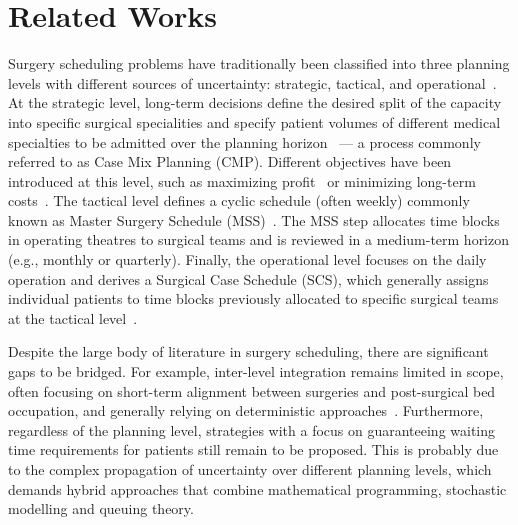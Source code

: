 \section{Related Works\label{sec:lit_review}}

Surgery scheduling problems have traditionally been classified into three planning levels with different sources of uncertainty: strategic, tactical, and operational~\citep{Rahimi2020Review, Cardoen2010, wang2021operating, Melo2025}. At the strategic level, long-term decisions define the desired split of the capacity into specific surgical specialities and specify patient volumes of different medical specialties to be admitted over the planning horizon~\citep{Burdett2023} --- a process commonly referred to as Case Mix Planning (CMP). Different objectives have been introduced at this level, such as maximizing profit~\citep{Fugener2015, Ma2013Mult} or minimizing long-term costs~\citep{Hof2015Casemix, Mcrae2020}.  The tactical level defines a cyclic schedule (often weekly) commonly known as Master Surgery Schedule (MSS)~\citep{Bovim2020,Siqueira2018INTO,Carneiro2025}. The MSS step allocates time blocks in operating theatres to surgical teams and is reviewed in a medium-term horizon (e.g., monthly or quarterly). 
Finally, the operational level focuses on the daily operation and derives a Surgical Case Schedule (SCS), which generally assigns individual patients to time blocks previously allocated to specific surgical teams at the tactical level~\citep{Vieira2025, Harris2022}.

Despite the large body of literature in surgery scheduling, there are significant gaps to be bridged. For example, inter-level integration remains limited in scope, often focusing on short-term alignment between surgeries and post-surgical bed occupation, and generally relying on deterministic approaches~\citep{Melo2025,wang2021operating, Siqueira2018INTO}. 
Furthermore, regardless of the planning level, strategies with a focus on guaranteeing waiting time requirements for patients still remain to be proposed. 
This is probably due to the complex propagation of uncertainty over different planning levels, which demands hybrid approaches that combine mathematical programming, stochastic modelling and queuing theory. %

